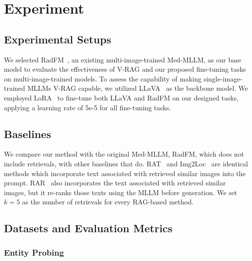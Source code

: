 \section{Experiment}

\subsection{Experimental Setups}

We selected RadFM~\cite{Wu2023TowardsGF}, an existing multi-image-trained Med-MLLM, as our base model to evaluate the effectiveness of V-RAG and our proposed fine-tuning tasks on multi-image-trained models. To assess the capability of making single-image-trained MLLMs V-RAG capable, we utilized LLaVA~\cite{Liu2023VisualIT} as the backbone model. We employed LoRA~\cite{Hu2021LoRALA} to fine-tune both LLaVA and RadFM on our designed tasks, applying a learning rate of 5e-5 for all fine-tuning tasks.




\subsection{Baselines}

We compare our method with the original Med-MLLM, RadFM, which does not include retrievals, with other baselines that do.
RAT~\cite{Sarto2024TowardsRA} and Img2Loc~\cite{Zhou2024Img2LocRI} are
identical methods which incorporate text associated with retrieved
similar images into the prompt.
RAR~\cite{Liu2024RARRA} also incorporates the text associated with retrieved
similar images, but it re-ranks those texts using the MLLM before generation.
We set $k = 5$ as the number of retrievals for every RAG-based method.





\subsection{Datasets and Evaluation Metrics}

\subsubsection{Entity Probing}

